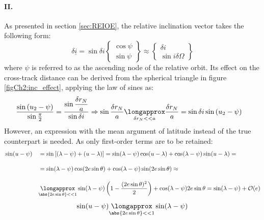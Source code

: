 			\paragraph{\textcolor{GMVred}{II.}  \\}
			\indent As presented in section \ref{sec:REIOE}, the relative inclination vector takes the following form:
			\[
			\delta \underline{i} = \sin\delta i\left\{
			\begin{array}{c}
			\cos\psi\\
			\sin\psi
			\end{array}
			\right\}
			\approx \left\{
			\begin{array}{c}
			\delta i \\
			\sin i \delta \Omega
			\end{array}
			\right\}
			\]
			\indent where $\psi$ is referred to as the ascending node of the relative orbit. Its effect on the cross-track distance can be derived from the spherical triangle in figure \ref{figCh2:inc_effect}, applying the law of sines as:
			\begin{align}
			&\label{eqCh2:r_N_1} \dfrac{\sin \left(u_2 - \psi\right)}{\sin\frac{\pi}{2}} = \dfrac{\sin\dfrac{\delta r_N}{a}}{\sin \delta i} \Rightarrow \sin \dfrac{\delta r_N}{a} \underset{\delta r_N << a}{\longapprox} \dfrac{\delta r_N}{a} = \sin \delta i \sin\left(u_2 - \psi\right)
			\end{align}
			\indent However, an expression with the mean argument of latitude instead of the true counterpart is needed. As only first-order terms are to be retained:
			\begin{alignat}{4}
			&\nonumber \sin(u -  \psi) 	&&= \sin \left[ (\lambda - \psi) + (u - \lambda)\right] = \sin (\lambda - \psi) \cos (u - \lambda) + \cos(\lambda-\psi)\sin (u -  \lambda) =\\[1 em]
			&\nonumber					&&  = \sin (\lambda - \psi) \cos(2e\sin\theta) + \cos(\lambda-\psi)\sin (2e\sin \theta) \approx\\[1 em]
			& \nonumber 				&& \underset{\tiny{\abs{2e\sin\theta} <<1}}{\longapprox}\sin (\lambda - \psi) \left(1 - \dfrac{(2e\sin\theta)^{2}}{2}\right) +  \cos(\lambda-\psi) 2e\sin\theta = \sin (\lambda - \psi) + \mathcal{O}(e)
			\end{alignat}
			\begin{equation}
			\label{eqCh2:Lambda_u} \sin(u -  \psi) \underset{\tiny{\abs{2e\sin\theta} <<1}}{\longapprox} \sin(\lambda -  \psi)
			\end{equation}
